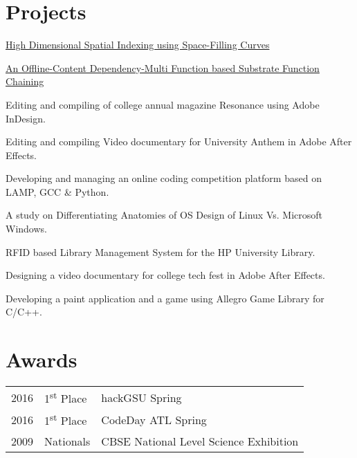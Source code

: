 \documentclass[]{deedy-resume-openfont}
\begin{document}
\begin{minipage}[t]{0.66\textwidth}

\section{Projects}
\begin{tightemize}
\item \href{https://www.researchgate.net/publication/301701477}{High Dimensional Spatial Indexing using Space-Filling Curves}
\item \href{https://www.researchgate.net/publication/301893131}{An Offline-Content Dependency-Multi Function based Substrate Function Chaining}
\end{tightemize}
\sectionsep
{}
\begin{tightemize}
\item Editing and compiling of college annual magazine Resonance using Adobe InDesign.
\item Editing and compiling Video documentary for University Anthem in Adobe After Effects.
\item Developing and managing an online coding competition platform based on LAMP, GCC \& Python.
\item A study on Differentiating Anatomies of OS Design of Linux Vs. Microsoft Windows.
\item RFID based Library Management System for the HP University Library.
\item Designing a video documentary for college tech fest in Adobe After Effects.
\item Developing a paint application and a game using Allegro Game Library for C/C++.
\end{tightemize}
\sectionsep
\sectionsep

\section{Awards} 
\begin{tabular}{rll}
2016	     & 1\textsuperscript{st} Place  & hackGSU Spring\\
2016	     & 1\textsuperscript{st} Place  & CodeDay ATL Spring\\
2009	     & Nationals  & CBSE National Level Science Exhibition\\



\end{tabular}
\sectionsep

\end{minipage} 
\end{document}

